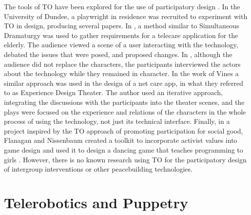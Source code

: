 \documentclass[dissertation,math,vertlayout,pdfa,colorlinks,nologo]{aaltoseries}
\begin{document}
The tools of TO have been explored for the use of participatory design \cite{macchiaExploringTheaterOppressed2016}. In the University of Dundee, a playwright in residence was recruited to experiment with TO in design, producing several papers. In \cite{morganRequirementsGatheringDiverse2008}, a method similar to Simultaneous Dramaturgy was used to gather requirements for a telecare application for the elderly. The audience viewed a scene of a user interacting with the technology, debated the issues that were posed, and proposed changes. In \cite{riceForumTheatreRequirements2007,newellUseTheatreRequirements2006}, although the audience did not replace the characters, the participants interviewed the actors about the technology while they remained in character. In the work of Vines \cite{vinesExperienceDesignTheatre2014, vinesPlayingProvocations2018} a similar approach was used in the design of a net care app, in what they referred to as Experience Design Theater. The author used an iterative approach, integrating the discussions with the participants into the theater scenes, and the plays were focused on the experience and relations of the characters in the whole process of using the technology, not just its technical interface. Finally, in a project inspired by the TO approach of promoting participation for social good, Flanagan and Nissenbaum created a toolkit to incorporate activist values into game design and used it to design a dancing game that teaches programming to girls \cite{flanaganGameDesignMethodology2007}. However, there is no known research using TO for the participatory design of intergroup interventions or other peacebuilding technologies. 

\section{Telerobotics and Puppetry}
\end{document}
